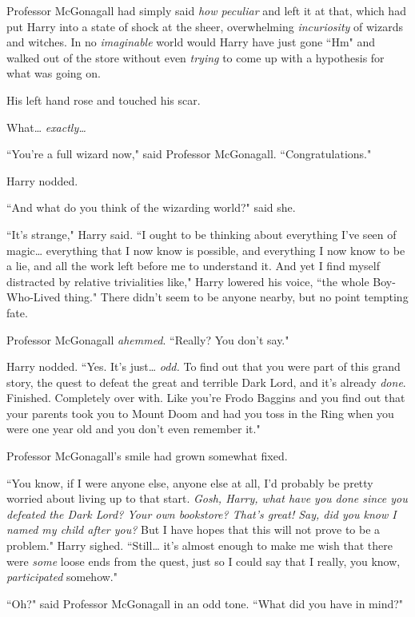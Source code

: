 Professor McGonagall had simply said \emph{how peculiar} and left it at that, which had put Harry into a state of shock at the sheer, overwhelming \emph{incuriosity} of wizards and witches. In no \emph{imaginable} world would Harry have just gone ``Hm" and walked out of the store without even \emph{trying} to come up with a hypothesis for what was going on.

His left hand rose and touched his scar.

What{\ldots} \emph{exactly{\ldots}}

``You're a full wizard now," said Professor McGonagall. ``Congratulations."

Harry nodded.

``And what do you think of the wizarding world?" said she.

``It's strange," Harry said. ``I ought to be thinking about everything I've seen of magic{\ldots} everything that I now know is possible, and everything I now know to be a lie, and all the work left before me to understand it. And yet I find myself distracted by relative trivialities like," Harry lowered his voice, ``the whole Boy-Who-Lived thing." There didn't seem to be anyone nearby, but no point tempting fate.

Professor McGonagall \emph{ahemmed}. ``Really? You don't say."

Harry nodded. ``Yes. It's just{\ldots} \emph{odd.} To find out that you were part of this grand story, the quest to defeat the great and terrible Dark Lord, and it's already \emph{done}. Finished. Completely over with. Like you're Frodo Baggins and you find out that your parents took you to Mount Doom and had you toss in the Ring when you were one year old and you don't even remember it."

Professor McGonagall's smile had grown somewhat fixed.

``You know, if I were anyone else, anyone else at all, I'd probably be pretty worried about living up to that start. \emph{Gosh, Harry, what have you done since you defeated the Dark Lord? Your own bookstore? That's great! Say, did you know I named my child after you?} But I have hopes that this will not prove to be a problem." Harry sighed. ``Still{\ldots} it's almost enough to make me wish that there were \emph{some} loose ends from the quest, just so I could say that I really, you know, \emph{participated} somehow."

``Oh?" said Professor McGonagall in an odd tone. ``What did you have in mind?"

